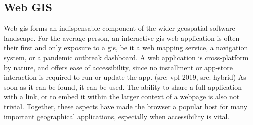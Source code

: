 \subsection*{Web GIS}
Web \ac{gis} forms an indispensable component of the wider geospatial software landscape. 
For the average person, an interactive \ac{gis} web application is often their first and only exposure to a \acs{gis}, be it a web mapping service, a navigation system, or a pandemic outbreak dashboard. 
A web application is cross-platform by nature, and offers ease of accessibility, since no installment or app-store interaction is required to run or update the app. (src: vpl 2019, src: hybrid)
As soon as it can be found, it can be used.
The ability to share a full application with a link, or to embed it within the larger context of a webpage is also not trivial. 
Together, these aspects have made the browser a popular host for many important geographical applications, especially when accessibility is vital.




